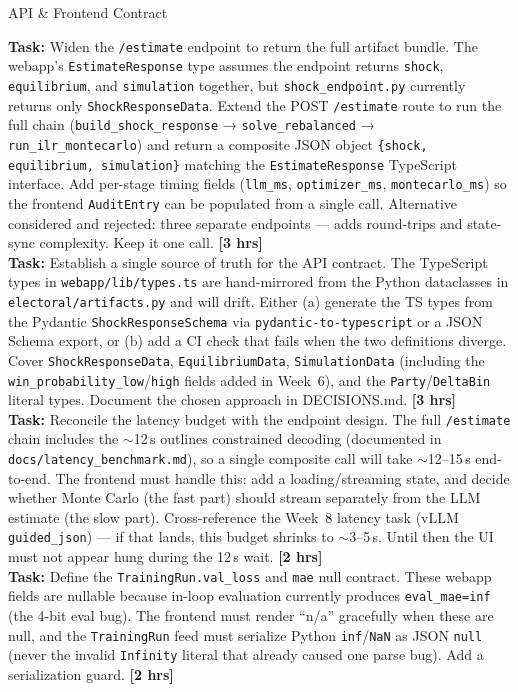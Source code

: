 \documentclass[11pt]{article}
\newcommand{\hrs}[1]{\textbf{[#1 hrs]}}
\newcommand{\task}[2]{%
  \noindent\textbf{Task:} #1 \hfill \hrs{#2}\\}
\begin{document}
\begin{taskbox}{API \& Frontend Contract}

\task{Widen the \texttt{/estimate} endpoint to return the full artifact
  bundle. The webapp's \texttt{EstimateResponse} type assumes the endpoint
  returns \texttt{shock}, \texttt{equilibrium}, and \texttt{simulation}
  together, but \texttt{shock\_endpoint.py} currently returns only
  \texttt{ShockResponseData}. Extend the POST \texttt{/estimate} route to
  run the full chain (\texttt{build\_shock\_response} →
  \texttt{solve\_rebalanced} → \texttt{run\_ilr\_montecarlo}) and return a
  composite JSON object \texttt{\{shock, equilibrium, simulation\}} matching
  the \texttt{EstimateResponse} TypeScript interface. Add per-stage timing
  fields (\texttt{llm\_ms}, \texttt{optimizer\_ms}, \texttt{montecarlo\_ms})
  so the frontend \texttt{AuditEntry} can be populated from a single call.
  Alternative considered and rejected: three separate endpoints --- adds
  round-trips and state-sync complexity. Keep it one call.}{3}

\task{Establish a single source of truth for the API contract. The
  TypeScript types in \texttt{webapp/lib/types.ts} are hand-mirrored from
  the Python dataclasses in \texttt{electoral/artifacts.py} and will drift.
  Either (a) generate the TS types from the Pydantic
  \texttt{ShockResponseSchema} via \texttt{pydantic-to-typescript} or a
  JSON Schema export, or (b) add a CI check that fails when the two
  definitions diverge. Cover \texttt{ShockResponseData},
  \texttt{EquilibriumData}, \texttt{SimulationData} (including the
  \texttt{win\_probability\_low}/\texttt{high} fields added in Week~6), and
  the \texttt{Party}/\texttt{DeltaBin} literal types. Document the chosen
  approach in DECISIONS.md.}{3}

\task{Reconcile the latency budget with the endpoint design. The full
  \texttt{/estimate} chain includes the $\sim$12\,s outlines constrained
  decoding (documented in \texttt{docs/latency\_benchmark.md}), so a
  single composite call will take $\sim$12--15\,s end-to-end. The frontend
  must handle this: add a loading/streaming state, and decide whether
  Monte Carlo (the fast part) should stream separately from the LLM
  estimate (the slow part). Cross-reference the Week~8 latency task
  (vLLM \texttt{guided\_json}) --- if that lands, this budget shrinks to
  $\sim$3--5\,s. Until then the UI must not appear hung during the 12\,s
  wait.}{2}

\task{Define the \texttt{TrainingRun.val\_loss} and \texttt{mae} null
  contract. These webapp fields are nullable because in-loop evaluation
  currently produces \texttt{eval\_mae=inf} (the 4-bit eval bug). The
  frontend must render ``n/a'' gracefully when these are null, and the
  \texttt{TrainingRun} feed must serialize Python \texttt{inf}/\texttt{NaN}
  as JSON \texttt{null} (never the invalid \texttt{Infinity} literal that
  already caused one parse bug). Add a serialization guard.}{2}


\end{taskbox}
\end{document}
